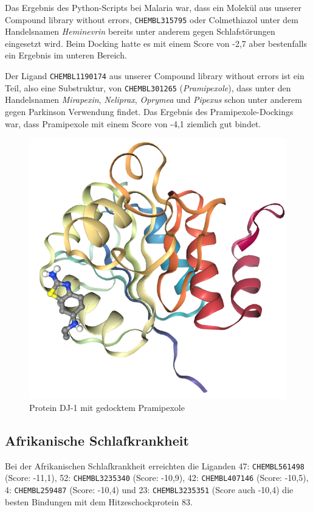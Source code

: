 \documentclass[10pt]{article}
\begin{document}
    Das Ergebnis des Python-Scripts bei Malaria war, dass ein Molekül aus unserer Compound library without errors,
    \texttt{CHEMBL315795} oder Colmethiazol unter dem Handelsnamen \emph{Heminevrin} bereits unter anderem gegen
    Schlafstörungen
    eingesetzt wird. Beim Docking hatte es mit einem Score von -2,7 aber bestenfalls ein Ergebnis im unteren Bereich.

    Der Ligand \texttt{CHEMBL1190174} aus unserer Compound library without errors ist ein Teil, also eine
    Substruktur, von
    \texttt{CHEMBL301265} (\emph{Pramipexole}), dass unter den Handelsnamen \emph{Mirapexin}, \emph{Neliprax},
    \emph{Oprymea} und \emph{Pipexus} schon
    unter anderem gegen Parkinson Verwendung findet.\cite{36} Das Ergebnis des Pramipexole-Dockings war, dass
    Pramipexole mit
    einem Score von -4,1 ziemlich gut bindet.

    \begin{figure}[H]
        \centering
        \includegraphics[width=0.6\linewidth]{Protein DJ-1 mit gedocktem Pramipexole}
        \caption{Protein DJ-1 mit gedocktem Pramipexole}\label{fig:figure-pf-pramipexole}
    \end{figure}

    \subsection{Afrikanische Schlafkrankheit}\label{subsec:afrikanische-schlafkrankheit}
    Bei der Afrikanischen Schlafkrankheit erreichten die Liganden 47: \texttt{CHEMBL561498} (Score: -11,1),
    52: \texttt{CHEMBL3235340}
    (Score: -10,9), 42: \texttt{CHEMBL407146} (Score: -10,5), 4: \texttt{CHEMBL259487} (Score: -10,4) und
    23: \texttt{CHEMBL3235351} (Score auch
    -10,4) die besten Bindungen mit dem Hitzeschockprotein 83.
\end{document}
